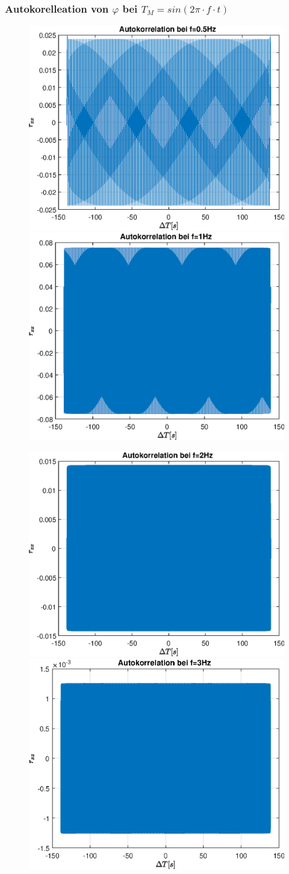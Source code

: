 \documentclass{article}
\begin{document}
\subsubsection{Autokorelleation von $\varphi$ bei $T_M = sin(2\pi\cdot f\cdot t)$}
\begin{figure}[!h]
\includegraphics[width=0.5\linewidth]{img/sim_rxx_sine_freq_0_5}
\includegraphics[width=0.5\linewidth]{img/sim_rxx_sine_freq_1}
\end{figure}
\begin{figure}[!h]
\includegraphics[width=0.5\linewidth]{img/sim_rxx_sine_freq_2}
\includegraphics[width=0.5\linewidth]{img/sim_rxx_sine_freq_3}
\end{figure}
\end{document}
